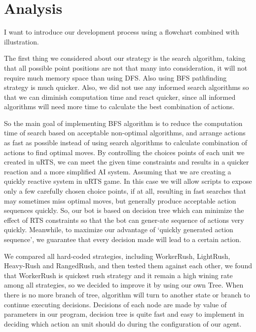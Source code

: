 \section{Analysis}

\label{section:Analysis}

I want to introduce our development process using a flowchart combined with illustration.



The first thing we considered about our strategy is the search algorithm, taking that all
possible point positions are not that many into consideration, it will not require much memory
space than using DFS. Also using BFS pathfinding strategy is much quicker. Also, we did not use
any informed search algorithms so that we can diminish computation time and react quicker, since
all informed algorithms will need more time to calculate the best combination of actions. 

So the main goal of implementing BFS algorithm is to reduce the computation time of search based
on acceptable non-optimal algorithms, and arrange actions as fast as possible instead of using search
algorithms to calculate combination of actions to find optimal moves. By controlling the choices
points of each unit we created in uRTS, we can meet the given time constraints and results in a
quicker reaction and a more simplified AI system. Assuming that we are creating a quickly reactive
system in uRTS game. In this case we will allow scripts to expose only a few carefully chosen choice
points, if at all, resulting in fast searches that may sometimes miss optimal moves, but generally produce
acceptable action sequences quickly\cite{barriga2018game}. So, our bot is based on decision tree
which can minimize the effect of RTS constraints so that the bot can gener-ate sequence of actions
very quickly. Meanwhile, to maximize our advantage of ‘quickly generated action sequence’, we guarantee
that every decision made will lead to a certain action. 

We compared all hard-coded strategies, including WorkerRush, LightRush, Heavy-Rush and RangedRush, and
then tested them against each other, we found that WorkerRush is quickest rush strategy and it remain
a high wining rate among all strategies, so we decided to improve it by using our own Tree. When there
is no more branch of tree, algorithm will turn to another state or branch to continue executing decisions.
Decisions of each node are made by value of parameters in our program, decision tree is quite fast and
easy to implement in deciding which action an unit should do during the configuration of our agent. 

